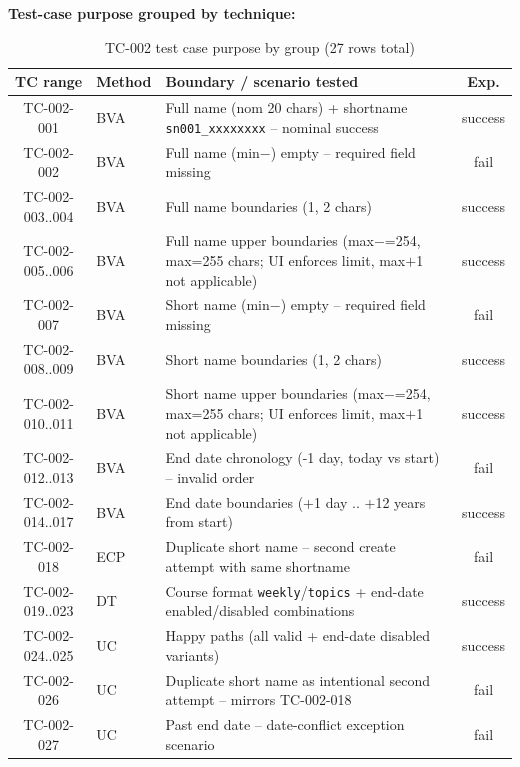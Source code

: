 \documentclass[twoside,final]{hcmut-report}
\begin{document}
\textbf{Test-case purpose grouped by technique:}
\begin{table}[H]
\centering
\renewcommand{\arraystretch}{1.2}
\begin{tabularx}{\textwidth}{|c|l|X|c|}
\hline
\textbf{TC range} & \textbf{Method} & \textbf{Boundary / scenario tested} & \textbf{Exp.} \\ \hline
TC-002-001 & BVA & Full name (nom 20 chars) + shortname \texttt{sn001\_xxxxxxxx} -- nominal success & success \\ \hline
TC-002-002 & BVA & Full name (min$-$) empty -- required field missing & fail \\ \hline
TC-002-003..004 & BVA & Full name boundaries (1, 2 chars) & success \\ \hline
TC-002-005..006 & BVA & Full name upper boundaries (max$-$=254, max=255 chars; UI enforces limit, max$+$1 not applicable) & success \\ \hline
TC-002-007 & BVA & Short name (min$-$) empty -- required field missing & fail \\ \hline
TC-002-008..009 & BVA & Short name boundaries (1, 2 chars) & success \\ \hline
TC-002-010..011 & BVA & Short name upper boundaries (max$-$=254, max=255 chars; UI enforces limit, max$+$1 not applicable) & success \\ \hline
TC-002-012..013 & BVA & End date chronology (-1 day, today vs start) -- invalid order & fail \\ \hline
TC-002-014..017 & BVA & End date boundaries (+1 day .. +12 years from start) & success \\ \hline
TC-002-018 & ECP & Duplicate short name -- second create attempt with same shortname & fail \\ \hline
TC-002-019..023 & DT & Course format \texttt{weekly}/\texttt{topics} + end-date enabled/disabled combinations & success \\ \hline
TC-002-024..025 & UC & Happy paths (all valid + end-date disabled variants) & success \\ \hline
TC-002-026 & UC & Duplicate short name as intentional second attempt -- mirrors TC-002-018 & fail \\ \hline
TC-002-027 & UC & Past end date -- date-conflict exception scenario & fail \\ \hline
\end{tabularx}
\caption{TC-002 test case purpose by group (27 rows total)}
\end{table}
\end{document}
